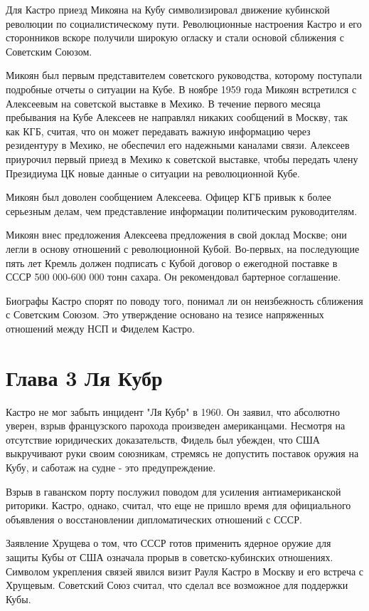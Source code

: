 \documentclass[14pt]{extreport}
\begin{document}

Для Кастро приезд Микояна на Кубу символизировал движение кубинской революции по социалистическому пути. Революционные настроения Кастро и его сторонников вскоре получили широкую огласку и стали основой сближения с Советским Союзом.

Микоян был первым представителем советского руководства, которому поступали подробные отчеты о ситуации на Кубе. В ноябре 1959 года Микоян встретился с Алексеевым на советской выставке в Мехико. В течение первого месяца пребывания на Кубе Алексеев не направлял никаких сообщений в Москву, так как КГБ, считая, что он может передавать важную информацию через резидентуру в Мехико, не обеспечил его надежными каналами связи. Алексеев приурочил первый приезд в Мехико к советской выставке, чтобы передать члену Президиума ЦК новые данные о ситуации на революционной Кубе.

Микоян был доволен сообщением Алексеева. Офицер КГБ привык к более серьезным делам, чем представление информации политическим руководителям.

Микоян внес предложения Алексеева предложения в свой доклад Москве; они легли в основу отношений с революционной Кубой. Во-первых, на последующие пять лет Кремль должен подписать с Кубой договор о ежегодной поставке в СССР 500 000-600 000 тонн сахара. Он рекомендовал бартерное соглашение.

Биографы Кастро спорят по поводу того, понимал ли он неизбежность сближения с Советским Союзом. Это утверждение основано на тезисе напряженных отношений между НСП и Фиделем Кастро.

\section{Глава 3 Ля Кубр}

Кастро не мог забыть инцидент "Ля Кубр" в 1960. Он заявил, что абсолютно уверен, взрыв французского парохода произведен американцами. Несмотря на отсутствие юридических доказательств, Фидель был убежден, что США выкручивают руки своим союзникам, стремясь не допустить поставок оружия на Кубу, и саботаж на судне - это предупреждение.

Взрыв в гаванском порту послужил поводом для усиления антиамериканской риторики. Кастро, однако, считал, что еще не пришло время для официального объявления о восстановлении дипломатических отношений с СССР. 

Заявление Хрущева о том, что СССР готов применить ядерное оружие для защиты Кубы от США означала прорыв в советско-кубинских отношениях. Символом укрепления связей явился визит Рауля Кастро в Москву и его встреча с Хрущевым. Советский Союз считал, что сделал все возможное для поддержки Кубы.
\end{document}
